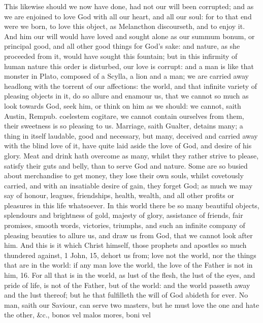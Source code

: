 {This likewise should we now have done, had not our will been corrupted;
and as we are enjoined to love God with all our heart, and all our
soul: for to that end were we born, to love this object, as
Melancthon discourseth, and to enjoy it. And him our will would
have loved and sought alone as our summum bonum, or principal good, and
all other good things for God's sake: and nature, as she proceeded from
it, would have sought this fountain; but in this infirmity of human
nature this order is disturbed, our love is corrupt: and a man is like
that monster in Plato, composed of a Scylla, a lion and a man; we
are carried away headlong with the torrent of our affections: the
world, and that infinite variety of pleasing objects in it, do so
allure and enamour us, that we cannot so much as look towards God, seek
him, or think on him as we should: we cannot, saith Austin, Rempub.
coelestem cogitare, we cannot contain ourselves from them, their
sweetness is so pleasing to us. Marriage, saith  Gualter, detains
many; a thing in itself laudable, good and necessary, but many,
deceived and carried away with the blind love of it, have quite laid
aside the love of God, and desire of his glory. Meat and drink hath
overcome as many, whilst they rather strive to please, satisfy their
guts and belly, than to serve God and nature. Some are so busied about
merchandise to get money, they lose their own souls, whilst covetously
carried, and with an insatiable desire of gain, they forget God; as
much we may say of honour, leagues, friendships, health, wealth, and
all other profits or pleasures in this life whatsoever. In this
world there be so many beautiful objects, splendours and brightness of
gold, majesty of glory, assistance of friends, fair promises, smooth
words, victories, triumphs, and such an infinite company of pleasing
beauties to allure us, and draw us from God, that we cannot look after
him. And this is it which Christ himself, those prophets and apostles
so much thundered against, 1 John,  15, dehort us from; love not
the world, nor the things that are in the world: if any man love the
world, the love of the Father is not in him, 16. For all that is in the
world, as lust of the flesh, the lust of the eyes, and pride of life,
is not of the Father, but of the world: and the world passeth away and
the lust thereof; but he that fulfilleth the will of God abideth for
ever. No man, saith our Saviour, can serve two masters, but he must
love the one and hate the other, \&c., bonos vel malos mores, boni vel
}

